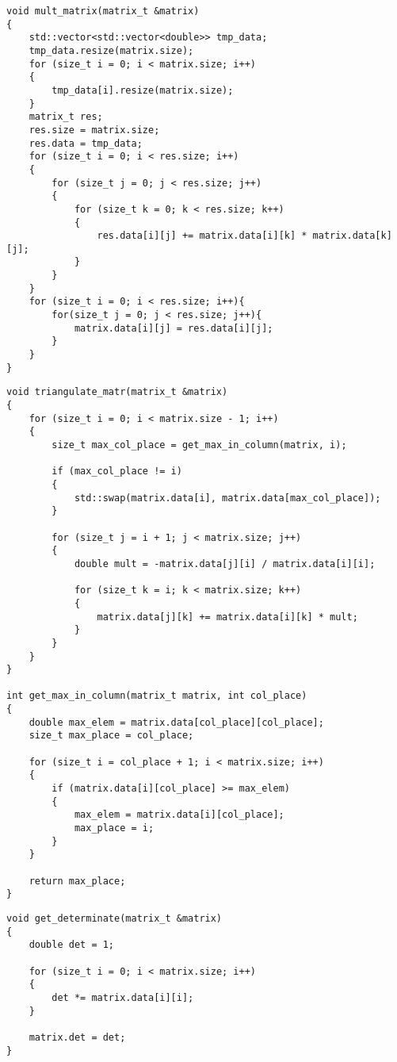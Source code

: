 \captionsetup{singlelinecheck = false, justification=raggedright}
\begin{lstlisting}[caption=Реализация алгоритма возведения матрицы в квадрат, 
    label={mult}]
void mult_matrix(matrix_t &matrix)
{
    std::vector<std::vector<double>> tmp_data;
    tmp_data.resize(matrix.size);
    for (size_t i = 0; i < matrix.size; i++)
    {
        tmp_data[i].resize(matrix.size);
    }
    matrix_t res;
    res.size = matrix.size;
    res.data = tmp_data;
    for (size_t i = 0; i < res.size; i++)
    {
        for (size_t j = 0; j < res.size; j++)
        {
            for (size_t k = 0; k < res.size; k++)
            {
                res.data[i][j] += matrix.data[i][k] * matrix.data[k][j];
            }
        }
    }
    for (size_t i = 0; i < res.size; i++){
        for(size_t j = 0; j < res.size; j++){
            matrix.data[i][j] = res.data[i][j];
        }
    }
}
\end{lstlisting}

\begin{lstlisting}[caption=Реализация алгоритма приведения матрицы к верхнетреугольному виду, 
    label={triangulation}]
void triangulate_matr(matrix_t &matrix)
{
    for (size_t i = 0; i < matrix.size - 1; i++)
    {
        size_t max_col_place = get_max_in_column(matrix, i);

        if (max_col_place != i)
        {
            std::swap(matrix.data[i], matrix.data[max_col_place]);
        }

        for (size_t j = i + 1; j < matrix.size; j++)
        {
            double mult = -matrix.data[j][i] / matrix.data[i][i];

            for (size_t k = i; k < matrix.size; k++)
            {
                matrix.data[j][k] += matrix.data[i][k] * mult;
            }
        }
    }
}

int get_max_in_column(matrix_t matrix, int col_place)
{
    double max_elem = matrix.data[col_place][col_place];
    size_t max_place = col_place;

    for (size_t i = col_place + 1; i < matrix.size; i++)
    {
        if (matrix.data[i][col_place] >= max_elem)
        {
            max_elem = matrix.data[i][col_place];
            max_place = i;
        }
    }

    return max_place;
}
\end{lstlisting}

\begin{lstlisting}[caption=Реализация алгоритма нахождения определителя верхнетругольной матрицы, 
    label={det}]
void get_determinate(matrix_t &matrix)
{
    double det = 1;

    for (size_t i = 0; i < matrix.size; i++)
    {
        det *= matrix.data[i][i];
    }

    matrix.det = det;
}
\end{lstlisting}

